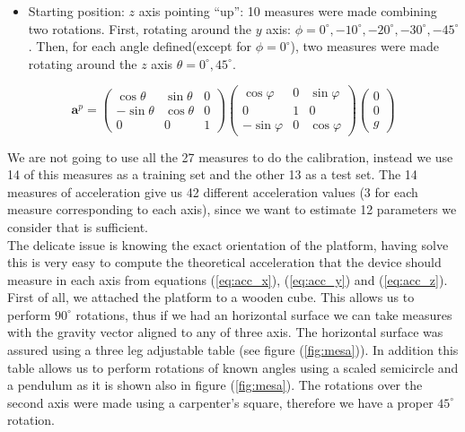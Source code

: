 \documentclass[conference]{IEEEtran}
\newcommand{\refp}[1]{(\ref{#1})}
\begin{document}
\begin{itemize}
\item Starting position: $z$ axis pointing ``up'': 10 measures were made combining two rotations. First, rotating around the $y$ axis: $\phi =0^\circ, -10^\circ, -20^\circ, -30^\circ, -45^\circ$. Then, for each angle defined(except for $\phi = 0^\circ$), two measures were made rotating around the $z$ axis $\theta = 0^\circ, 45^\circ$.   \end{itemize}

\begin{scriptsize}
\begin{equation}
\mathbf{a}^p = \left(\begin{array}{ccc}
\cos \theta & \sin \theta & 0\\
-\sin \theta & \cos \theta & 0\\
0 & 0 & 1
\end{array}\right)\left(\begin{array}{ccc}
\cos \varphi & 0 &\sin \varphi\\
0 & 1 & 0\\
-\sin \varphi & 0 & \cos \varphi
\end{array}\right)\left(\begin{array}{c}
0\\
0\\
g
\end{array}\right)
\label{eq:acc_z}
\end{equation}
\end{scriptsize}

We are not going to use all the 27 measures to do the calibration, instead we use 14 of this measures as a training set and the other 13 as a test set. The 14 measures of acceleration give us 42 different acceleration values (3 for each measure corresponding to each axis), since we want to estimate 12 parameters we consider that is sufficient.\\

The delicate issue is knowing the exact orientation of the platform, having solve this is very easy to compute the theoretical acceleration that the device should measure in each axis from equations \refp{eq:acc_x}, \refp{eq:acc_y} and \refp{eq:acc_z}.\\

First of all, we attached the platform to a wooden cube. This allows us to perform $90^\circ$ rotations, thus if we had an horizontal surface we can take measures with the gravity vector aligned to any of three axis. The horizontal surface was assured using a three leg adjustable table (see figure \refp{fig:mesa}). In addition this table allows us to perform rotations of known angles using a scaled semicircle and a pendulum as it is shown also in figure \refp{fig:mesa}. The rotations over the second axis were made using a carpenter's square, therefore we have a proper $45^\circ$ rotation.\\
\end{document}
